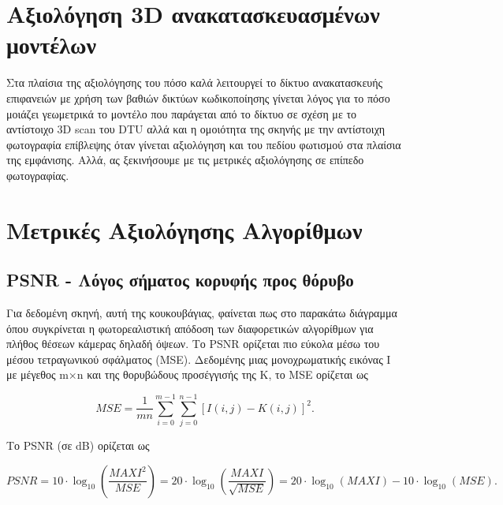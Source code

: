 \section{Αξιολόγηση 3D ανακατασκευασμένων μοντέλων}

Στα πλαίσια της αξιολόγησης του πόσο καλά λειτουργεί το δίκτυο ανακατασκευής  επιφανειών με χρήση των βαθιών δικτύων κωδικοποίησης γίνεται λόγος για το πόσο μοιάζει γεωμετρικά το μοντέλο που παράγεται από το δίκτυο σε σχέση με το αντίστοιχο 3D scan του DTU αλλά και η ομοιότητα της σκηνής με την αντίστοιχη φωτογραφία επίβλεψης όταν γίνεται αξιολόγηση και του πεδίου φωτισμού στα πλαίσια της εμφάνισης.  Αλλά, ας ξεκινήσουμε με τις μετρικές αξιολόγησης σε επίπεδο φωτογραφίας.
\section{Μετρικές Αξιολόγησης Αλγορίθμων}
\subsection{PSNR - Λόγος σήματος κορυφής προς θόρυβο}
Για δεδομένη  σκηνή, αυτή της κουκουβάγιας, φαίνεται πως στο παρακάτω διάγραμμα όπου συγκρίνεται η φωτορεαλιστική απόδοση των διαφορετικών αλγορίθμων για πλήθος θέσεων κάμερας δηλαδή όψεων. 
Το PSNR ορίζεται πιο εύκολα μέσω του μέσου τετραγωνικού σφάλματος (MSE). Δεδομένης μιας μονοχρωματικής εικόνας I με μέγεθος m×n και της θορυβώδους προσέγγισής της K, το MSE ορίζεται ως

    \[
    M S E = \frac{1}{mn} \sum_{i=0}^{m-1} \sum_{j=0}^{n-1} [I(i, j) - K(i, j)]^2.
    \]
    
    Το PSNR (σε dB) ορίζεται ως
    
    \[
    P S N R = 10 \cdot \log_{10}\left(\frac{MAXI^2}{MSE}\right) = 20 \cdot \log_{10}\left(\frac{MAXI}{\sqrt{MSE}}\right) = 20 \cdot \log_{10}(MAXI) - 10 \cdot \log_{10}(MSE).
    \]
    
